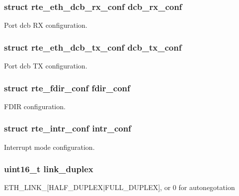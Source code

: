 \subsubsection[{dcb\+\_\+rx\+\_\+conf}]{\setlength{\rightskip}{0pt plus 5cm}struct rte\+\_\+eth\+\_\+dcb\+\_\+rx\+\_\+conf dcb\+\_\+rx\+\_\+conf}\label{structrte__eth__conf_afa63f7644ae1693b8a809ef99cb70d77}
Port dcb R\+X configuration. \hypertarget{structrte__eth__conf_af9544423109c0c107ca74d73d483e703}{}
\subsubsection[{dcb\+\_\+tx\+\_\+conf}]{\setlength{\rightskip}{0pt plus 5cm}struct rte\+\_\+eth\+\_\+dcb\+\_\+tx\+\_\+conf dcb\+\_\+tx\+\_\+conf}\label{structrte__eth__conf_af9544423109c0c107ca74d73d483e703}
Port dcb T\+X configuration. \hypertarget{structrte__eth__conf_a7b34faaa974b49846ba99f27f5c7ad5f}{}
\subsubsection[{fdir\+\_\+conf}]{\setlength{\rightskip}{0pt plus 5cm}struct {\bf rte\+\_\+fdir\+\_\+conf} fdir\+\_\+conf}\label{structrte__eth__conf_a7b34faaa974b49846ba99f27f5c7ad5f}
F\+D\+I\+R configuration. \hypertarget{structrte__eth__conf_a9fad7bac275e3526e2a3708f70205b4c}{}
\subsubsection[{intr\+\_\+conf}]{\setlength{\rightskip}{0pt plus 5cm}struct {\bf rte\+\_\+intr\+\_\+conf} intr\+\_\+conf}\label{structrte__eth__conf_a9fad7bac275e3526e2a3708f70205b4c}
Interrupt mode configuration. \hypertarget{structrte__eth__conf_a8a9a73e9e688ae4d72cf319872c0bdf1}{}
\subsubsection[{link\+\_\+duplex}]{\setlength{\rightskip}{0pt plus 5cm}uint16\+\_\+t link\+\_\+duplex}\label{structrte__eth__conf_a8a9a73e9e688ae4d72cf319872c0bdf1}
E\+T\+H\+\_\+\+L\+I\+N\+K\+\_\+\mbox{[}H\+A\+L\+F\+\_\+\+D\+U\+P\+L\+E\+X$\vert$\+F\+U\+L\+L\+\_\+\+D\+U\+P\+L\+E\+X\mbox{]}, or 0 for autonegotation \hypertarget{structrte__eth__conf_a7d93770cafbfd72bb3bbd1aaec9894ab}{}
